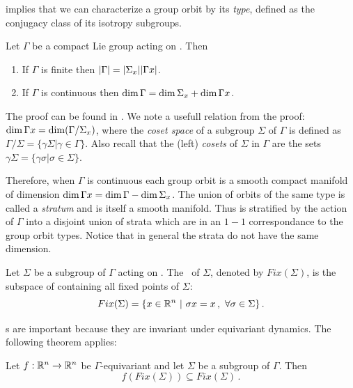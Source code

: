  implies that we can characterize a group orbit by its \emph{type}, defined
as the conjugacy class of its isotropy subgroups.

\begin{proposition}
 Let $\Gamma$ be a compact Lie group acting on . Then
 \begin{enumerate}
  \item If $\Gamma$ is finite then $|\Gamma|=|\Sigma_x||\Gamma x|$.
  \item If $\Gamma$ is continuous then $\dim \Gamma = \dim \Sigma_x+\dim \Gamma x$.
 \end{enumerate}
\end{proposition}
The proof can be found in . We note a usefull relation from the proof: $\dim\Gamma x =\dim(\Gamma/\Sigma_x)$, where the \emph{coset space} of a subgroup $\Sigma$  of $\Gamma$ is defined as $\Gamma/\Sigma=\{\gamma\Sigma|\gamma\in\Gamma\}$. Also recall that the (left) \emph{cosets} of $\Sigma$ in $\Gamma$ are the sets $\gamma\Sigma=\{\gamma\sigma|\sigma\in\Sigma\}$.

Therefore, when $\Gamma$ is continuous each group orbit is a smooth compact manifold of dimension
$\dim \Gamma x=\dim \Gamma-\dim \Sigma_x$. The union of orbits of the same type is called a \emph{stratum}
and is itself a smooth manifold. Thus  is stratified by the action of $\Gamma$ into
a disjoint union of strata which are in an $1-1$ correspondance to the group orbit types. Notice that in general
the strata do not have the same dimension.

\begin{definition}
 \label{def:fixedsp}
  Let $\Sigma$ be a subgroup of $\Gamma$ acting on . The \fixedsp\ of $\Sigma$, denoted by $Fix(\Sigma)$, is the subspace of  containing all fixed points of $\Sigma$:
\[
	Fix(\Sigma)=\{x\in\mathbb{R}^{n}\ |\ \sigma x = x\,,\ \forall \sigma\in\Sigma\}\,.
\]
\end{definition}

\fixedsp s are important because they are invariant under equivariant dynamics. The following theorem applies:

\begin{theorem}
 Let $f:\mathbb{R}^{n}\rightarrow\mathbb{R}^{n}$ be $\Gamma$-equivariant and let $\Sigma$ be a subgroup of $\Gamma$. Then
\[
 f\left(Fix(\Sigma)\right)\subseteq Fix(\Sigma)\,.
\]
\end{theorem}

